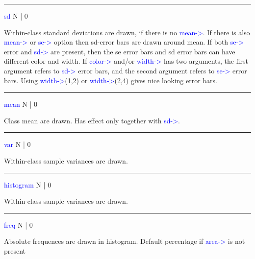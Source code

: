 \vspace{0.3cm} 
\hrule 
\vspace{0.3cm} 
\noindent \textcolor{blue}{sd}  \tabto{3cm}  N | 0  \tabto{5cm}    \tabto{7cm} 
\begin{changemargin}{3cm}{0cm} 
\noindent  Within-class standard deviations are drawn, if there is no \textcolor{blue}{mean->}. 
If there is also \textcolor{blue}{mean->} or \textcolor{blue}{se->} option then sd-error bars are drawn 
around mean. If both \textcolor{blue}{se->} error and \textcolor{blue}{sd->} are present, then the se error bars and 
sd error bars can have different color and width. If \textcolor{blue}{color->} and/or \textcolor{blue}{width->} has two 
arguments, the first argument refers to \textcolor{blue}{sd->} error bars, and the second argument refers to 
\textcolor{blue}{se->} error bars. Using \textcolor{blue}{width->}(1,2) or \textcolor{blue}{width->}(2,4) gives nice looking error bars. 
 
\end{changemargin} 
\vspace{0.3cm} 
\hrule 
\vspace{0.3cm} 
\noindent \textcolor{blue}{mean}  \tabto{3cm}  N | 0  \tabto{5cm}    \tabto{7cm} 
\begin{changemargin}{3cm}{0cm} 
\noindent  Class mean are drawn. Has effect only together with \textcolor{blue}{sd->}. 
\end{changemargin} 
\vspace{0.3cm} 
\hrule 
\vspace{0.3cm} 
\noindent \textcolor{blue}{var}  \tabto{3cm}  N | 0  \tabto{5cm}     \tabto{7cm} 
\begin{changemargin}{3cm}{0cm} 
\noindent Within-class sample variances are drawn. 
\end{changemargin} 
\vspace{0.3cm} 
\hrule 
\vspace{0.3cm} 
\noindent \textcolor{blue}{histogram}  \tabto{3cm}   N | 0  \tabto{5cm}     \tabto{7cm} 
\begin{changemargin}{3cm}{0cm} 
\noindent Within-class sample variances are drawn. 
\end{changemargin} 
\vspace{0.3cm} 
\hrule 
\vspace{0.3cm} 
\noindent \textcolor{blue}{freq}  \tabto{3cm}  N | 0  \tabto{5cm}     \tabto{7cm} 
\begin{changemargin}{3cm}{0cm} 
\noindent  Absolute  frequences are drawn in histogram. Default 
percentage if \textcolor{blue}{area->} is not present 
\end{changemargin} 
